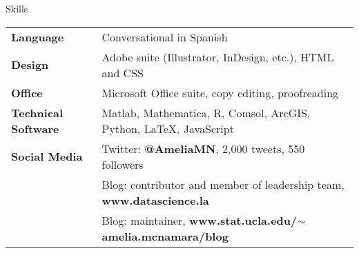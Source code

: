 \documentclass{resume} %
\begin{document}
\begin{rSection}{Skills}

\begin{tabular}{ @{} >{\bfseries}l @{\hspace{6ex}} l }
Language & Conversational in Spanish \\
Design & Adobe suite (Illustrator, InDesign, etc.), %
HTML and CSS \\
Office & Microsoft Office suite, copy editing, proofreading %
 \\
Technical Software & Matlab, Mathematica, R, Comsol, ArcGIS, Python, LaTeX, JavaScript \\
Social Media & Twitter: \textbf{@AmeliaMN}, 2,000 tweets, 550 followers \\
 & Blog: contributor and member of leadership team, \textbf{www.datascience.la} \\
 & Blog: maintainer, \textbf{www.stat.ucla.edu/$\sim$amelia.mcnamara/blog}
\end{tabular}
\end{rSection}
\end{document}

